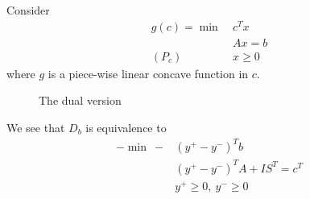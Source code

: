 Consider
\begin{align*}
	g(c)=\min~ & c^Tx    \\
	           & Ax = b  \\
	(P_c)\quad & x\geq 0
\end{align*}
where \(g\) is a piece-wise linear concave function in \(c\).

\begin{figure}[H]
	\centering
	\caption{The dual version}
	\label{fig:local-analysis-dual}
\end{figure}

We see that \(D_b\) is equivalence to
\begin{align*}
	-\min~  - & (y^+ - y^-)^{T}b                   \\
	          & (y^+ - y^-)^{T}A + I S^{T} = c^{T} \\
	          & y^+\geq 0,\ y^- \geq 0
\end{align*}
